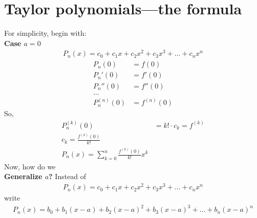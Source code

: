 \section{Taylor polynomials---the formula}
For simplicity, begin with: \\
\textbf{Case \(a = 0\)} \\
\begin{align*}
    P_n(x) = c_0 + c_1x + c_2x^2 + c_3x^3 + \dots + c_n x^n
\end{align*} \begin{align*}
    P_n(0)       & = f(0)       \\
    P_n'(0)      & = f'(0)      \\
    P_n''(0)     & = f''(0)     \\
    \dots                       \\
    P_n^{(n)}(0) & = f^{(n)}(0)
\end{align*}
So, \begin{align*}
    P_n^{(k)}(0) & = k! \cdot c_k = f^{(k)} \\
    c_k = \frac{f^{(k)}(0)}{k!}             \\
    \boxed{P_n(x) = \sum_{k = 0}^{n} \frac{f^{(k)}(0)}{k!} x^k}
\end{align*}
Now, how do we \\
\textbf{Generalize \(a\)?}
Instead of \begin{align*}
    P_n(x) = c_0 + c_1x + c_2x^2 + c_3x^3 + \dots + c_n x^n
\end{align*}
write \begin{align*}
    P_n(x) = b_0 + b_1(x - a) + b_2(x - a)^2 + b_3(x - a)^3 + \dots + b_n (x - a)^n
\end{align*}
